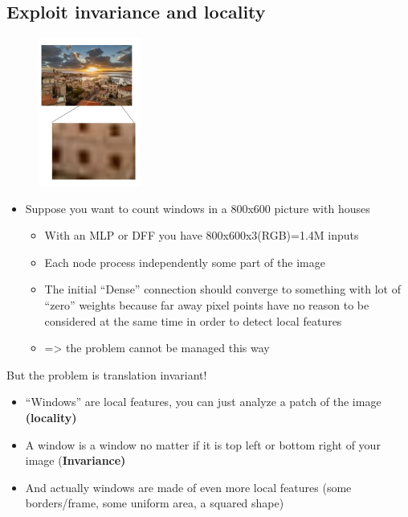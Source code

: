 \subsection{Exploit invariance and locality}

\begin{figure}
	\includegraphics[width=0.3\textwidth]{figure_ml/windows.png}
\end{figure} 
\quad
\begin{itemize}
	\item Suppose you want to count windows in a 800x600	picture with houses
	\begin{itemize}
		\item With an MLP or DFF you have 800x600x3(RGB)=1.4M inputs
		\item Each node process independently some part of the image
		\item The initial “Dense” connection should converge to something with lot of “zero” weights because far away pixel points have no reason to be considered at the same time in order to detect	local features
		\item => the problem cannot be managed this way
	\end{itemize}
\end{itemize}

But the problem is translation invariant!

\begin{itemize}
	\item “Windows” are local features, you can just analyze a patch of the image \textbf{(locality)}
	\item A window is a window no matter if it is top left or bottom right of	your image (\textbf{Invariance)}
	\item And actually windows are made of even more local features (some borders/frame, some uniform area, a squared shape)
\end{itemize}

